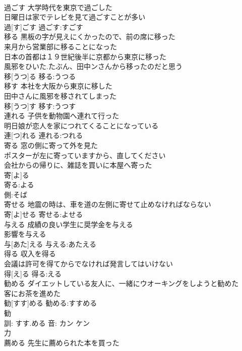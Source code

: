 \documentclass[8pt]{extreport}
\begin{document}
\begin{CJK}{UTF8}{min}
\\	過ごす	大学時代を東京で過ごした 
\\	日曜日は家でテレビを見て過ごすことが多い 
\\	過[す]ごす			過ごす:すごす
\\	移る	黒板の字が見えにくかったので、前の席に移った 
\\	来月から営業部に移ることになった 
\\	日本の首都は１９世紀後半に京都から東京に移った 
\\	風邪をひいた.たぶん、田中ンさんから移ったのだと思う 
\\	移[うつ]る			移る:うつる
\\	移す	本社を大阪から東京に移した 
\\	田中さんに風邪を移されてしまった 
\\	移[うつ]す			移す:うつす
\\	連れる	子供を動物園へ連れて行った 
\\	明日娘が恋人を家につれてくることになっている 
\\	連[つ]れる			連れる:つれる
\\	寄る	窓の側に寄って外を見た 
\\	ポスターが左に寄っていますから、直してください 
\\	会社からの帰りに、雑誌を買いに本屋へ寄った 
\\	寄[よ]る		
\\	寄る:よる
\\	側:そば
\\	寄せる	地震の時は、車を道の左側に寄せて止めなければならない 
\\	寄[よ]せる			寄せる:よせる
\\	与える	成績の良い学生に奨学金を与える 
\\	影響を与える 
\\	与[あた]える			与える:あたえる
\\	得る	収入を得る 
\\	会議は許可を得てからでなければ発言してはいけない 
\\	得[え]る			得る:える
\\	勧める	ダイエットしている友人に、一緒にウオーキングをしようと勧めた 
\\	客にお茶を進めた 
\\	勧[すす]める			勧める:すすめる
\\	勧 
\\	訓: すす.める 音: カン ケン 
\\	力 
\\	薦める	先生に薦められた本を買った 

\end{CJK}
\end{document}

